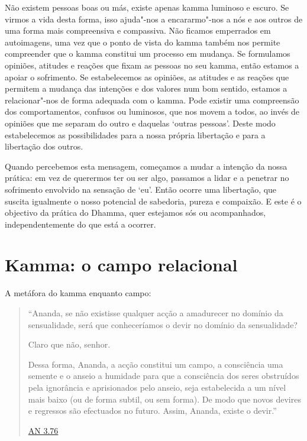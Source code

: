 Não existem pessoas boas ou más, existe apenas kamma luminoso e escuro. Se
virmos a vida desta forma, isso ajuda"-nos a encararmo"-nos a nós e aos outros
de uma forma mais compreensiva e compassiva. Não ficamos emperrados em
autoimagens, uma vez que o ponto de vista do kamma também nos permite
compreender que o kamma constitui um processo em mudança. Se formulamos
opiniões, atitudes e reações que fixam as pessoas no seu kamma, então estamos a
apoiar o sofrimento. Se estabelecemos as opiniões, as atitudes e as reações que
permitem a mudança das intenções e dos valores num bom sentido, estamos a
relacionar"-nos de forma adequada com o kamma. Pode existir uma compreensão dos
comportamentos, confusos ou luminosos, que nos movem a todos, ao invés de
opiniões que me separam do outro e daquelas `outras pessoas'. Deste modo
estabelecemos as possibilidades para a nossa própria libertação e para a
libertação dos outros.

Quando percebemos esta mensagem, começamos a mudar a intenção da nossa prática:
em vez de querermos ter ou ser algo, passamos a lidar e a penetrar no sofrimento
envolvido na sensação de `eu'. Então ocorre uma libertação, que suscita
igualmente o nosso potencial de sabedoria, pureza e compaixão. E este é o
objectivo da prática do Dhamma, quer estejamos sós ou acompanhados,
independentemente do que está a ocorrer.

\section{Kamma: o campo relacional}

A metáfora do kamma enquanto campo:

\begin{quote}
  ``Ananda, se não existisse qualquer acção a amadurecer no domínio da
  sensualidade, será que conheceríamos o devir no domínio da sensualidade?

  Claro que não, senhor.

  Dessa forma, Ananda, a acção constitui um campo, a consciência uma semente e o
  anseio a humidade para que a consciência dos seres obstruídos pela ignorância
  e aprisionados pelo anseio, seja estabelecida a um nível mais baixo (ou de
  forma subtil, ou sem forma). De modo que novos devires e regressos são
  efectuados no futuro. Assim, Ananda, existe o devir.''

  \href{https://suttacentral.net/an3.76/en/thanissaro}{AN 3.76}
\end{quote}

